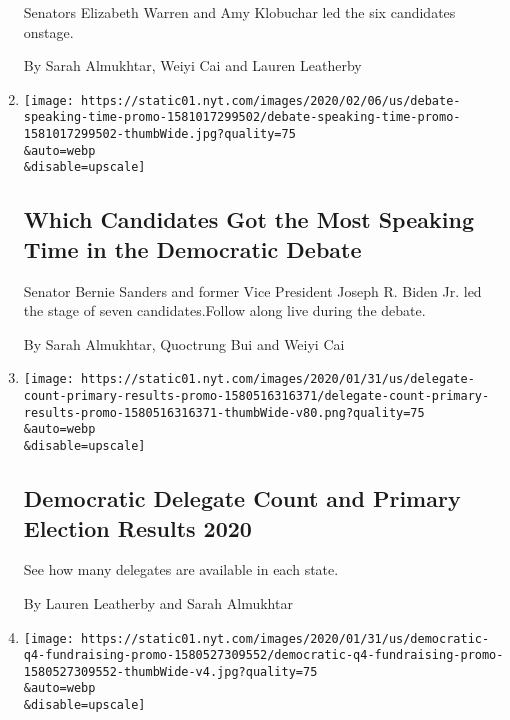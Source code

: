 \begin{enumerate}
  Senators Elizabeth Warren and Amy Klobuchar led the six candidates
  onstage.

  By Sarah Almukhtar, Weiyi Cai and Lauren Leatherby
\item
  \href{/interactive/2020/02/07/us/elections/debate-speaking-time.html}{}

  \texttt{[image: https://static01.nyt.com/images/2020/02/06/us/debate-speaking-time-promo-1581017299502/debate-speaking-time-promo-1581017299502-thumbWide.jpg?quality=75\\\&auto=webp\\\&disable=upscale]}

  \hypertarget{which-candidates-got-the-most-speaking-time-in-the-democratic-debate-1}{%
  \subsection{Which Candidates Got the Most Speaking Time in the
  Democratic
  Debate}\label{which-candidates-got-the-most-speaking-time-in-the-democratic-debate-1}}

  Senator Bernie Sanders and former Vice President Joseph R. Biden Jr.
  led the stage of seven candidates.Follow along live during the debate.

  By Sarah Almukhtar, Quoctrung Bui and Weiyi Cai
\item
  \href{/interactive/2020/us/elections/delegate-count-primary-results.html}{}

  \texttt{[image: https://static01.nyt.com/images/2020/01/31/us/delegate-count-primary-results-promo-1580516316371/delegate-count-primary-results-promo-1580516316371-thumbWide-v80.png?quality=75\\\&auto=webp\\\&disable=upscale]}

  \hypertarget{democratic-delegate-count-and-primary-election-results-2020}{%
  \subsection{Democratic Delegate Count and Primary Election Results
  2020}\label{democratic-delegate-count-and-primary-election-results-2020}}

  See how many delegates are available in each state.

  By Lauren Leatherby and Sarah Almukhtar
\item
  \href{/interactive/2020/02/01/us/elections/democratic-q4-fundraising.html}{}

  \texttt{[image: https://static01.nyt.com/images/2020/01/31/us/democratic-q4-fundraising-promo-1580527309552/democratic-q4-fundraising-promo-1580527309552-thumbWide-v4.jpg?quality=75\\\&auto=webp\\\&disable=upscale]}


\end{enumerate}
